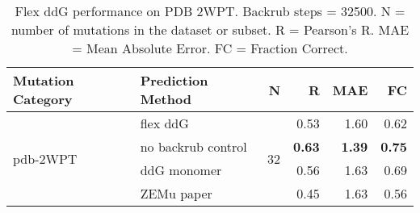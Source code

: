 \begin{table}
  \begin{tabular}{llrrrr}
\toprule
Mutation Category &   Prediction Method &   N &    R &  MAE &   FC \\
\midrule
 \multirow{ 4}{*}{pdb-2WPT} & flex ddG & \multirow{ 4}{*}{32} & 0.53 & 1.60 & 0.62  \\
 & no backrub control & & \textbf{0.63} & \textbf{1.39} & \textbf{0.75}  \\
 & ddG monomer & & 0.56 & 1.63 & 0.69  \\
 & ZEMu paper & & 0.45 & 1.63 & 0.56  \\
\bottomrule
\end{tabular}
  \caption[Flex ddG performance on PDB 2WPT]{
    Flex ddG performance on PDB 2WPT. Backrub steps = 32500. N = number of mutations in the dataset or subset. R = Pearson's R. MAE = Mean Absolute Error. FC = Fraction Correct.
  } \label{tab:table-pdb-2WPT}
\end{table}
